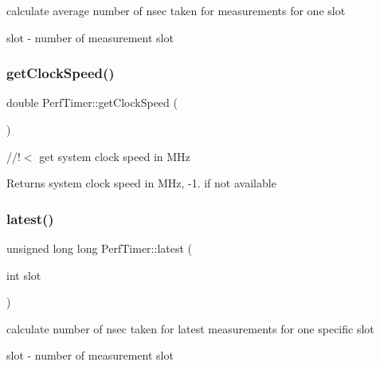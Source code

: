 calculate average number of nsec taken for measurements for one slot 

\begin{DoxyItemize}
\item {\ttfamily slot} -\/ number of measurement slot \end{DoxyItemize}
\mbox{\label{classPerfTimer_ada7ba72a813fdb2b0dad40894e06660f}} 
\subsubsection{\texorpdfstring{get\+Clock\+Speed()}{getClockSpeed()}}
{\footnotesize\ttfamily double Perf\+Timer\+::get\+Clock\+Speed (\begin{DoxyParamCaption}{ }\end{DoxyParamCaption})\hspace{0.3cm}{\ttfamily [inline]}}



//!$<$ get system clock speed in M\+Hz 

\begin{DoxyReturn}{Returns}
system clock speed in M\+Hz, -\/1. if not available 
\end{DoxyReturn}
\mbox{\label{classPerfTimer_a5eef9b392152d13af1359c9bfd13c436}} 
\subsubsection{\texorpdfstring{latest()}{latest()}}
{\footnotesize\ttfamily unsigned long long Perf\+Timer\+::latest (\begin{DoxyParamCaption}\item[{int}]{slot }\end{DoxyParamCaption})}



calculate number of nsec taken for latest measurements for one specific slot 

\begin{DoxyItemize}
\item {\ttfamily slot} -\/ number of measurement slot \end{DoxyItemize}
\mbox{\label{classPerfTimer_aaef17f123debaf55d86bd3eb4ed0de0e}} 
